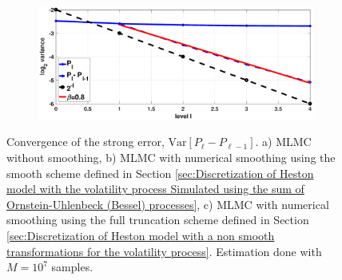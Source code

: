\begin{figure}[htb]
\begin{subfigure}{0.5\textwidth}
		\caption{}
		\label{fig:strong_rate_hest_digital_smoothing_OU}
	\end{subfigure}\hfil %
	\begin{subfigure}{0.5\textwidth}
		\includegraphics[width=\linewidth]{./figures/MLMC_binary_Heston_opt/with_smoothing/FT/digital_option_set1_L_0_2_steps_L_4_N_10_7_beta_32/digital_option_set1_L_0_2_steps_L_4_N_10_7_strong}
		\caption{}
		\label{fig:strong_rate_hest_digital_smoothing_FT}
	\end{subfigure}
	\caption{Convergence of  the strong error, $\text{Var}\left[P_{\ell}-P_{\ell-1}\right]$. a) MLMC without smoothing, b) MLMC with numerical smoothing using the smooth scheme defined in Section \ref{sec:Discretization of Heston model with the volatility process Simulated using the sum of  Ornstein-Uhlenbeck (Bessel) processes}, c) MLMC with numerical smoothing using the full truncation scheme defined in Section \ref{sec:Discretization of Heston model with a non smooth transformations for the volatility process}.  Estimation done with $M=10^7$ samples.}
	\label{fig:strong_rate_hest_digital}	
\end{figure}
\FloatBarrier

%


